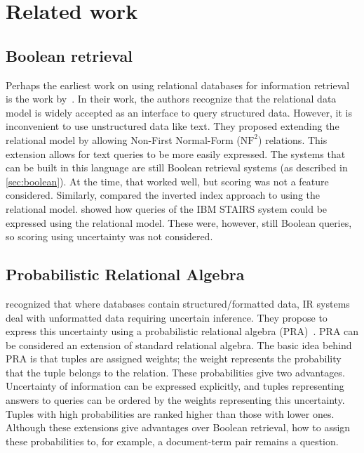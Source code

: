 \section{Related work}

\subsection{Boolean retrieval}
Perhaps the earliest work on using relational databases for information retrieval is the work by~\citet{SchekPistor}. In their work, the authors recognize that the relational data model is widely accepted as an interface to query structured data. However, it is inconvenient to use unstructured data like text. They proposed extending the relational model by allowing Non-First Normal-Form ($\text{NF}^2$) relations. This extension allows for text queries to be more easily expressed. The systems that can be built in this language are still Boolean retrieval systems (as described in \cref{sec:boolean}). At the time, that worked well, but scoring was not a feature considered.  
Similarly, \citet{macleod} compared the inverted index approach to using the relational model.  showed how queries of the IBM STAIRS system could be expressed using the relational model. These were, however, still Boolean queries, so scoring using uncertainty was not considered. 

\subsection{Probabilistic Relational Algebra}
 recognized that where databases contain structured/formatted data, IR systems deal with unformatted data requiring uncertain inference. They propose to express this uncertainty using a probabilistic relational algebra (PRA)~\citep{fuhr-pra}. 
PRA can be considered an extension of standard relational algebra. 
The basic idea behind PRA is that tuples are assigned weights; the weight represents the probability that the tuple belongs to the relation. These probabilities give two advantages. Uncertainty of information can be expressed explicitly, and tuples representing answers to queries can be ordered by the weights representing this uncertainty. Tuples with high probabilities are ranked higher than those with lower ones. Although these extensions give advantages over Boolean retrieval, how to assign these probabilities to, for example, a document-term pair remains a question.

